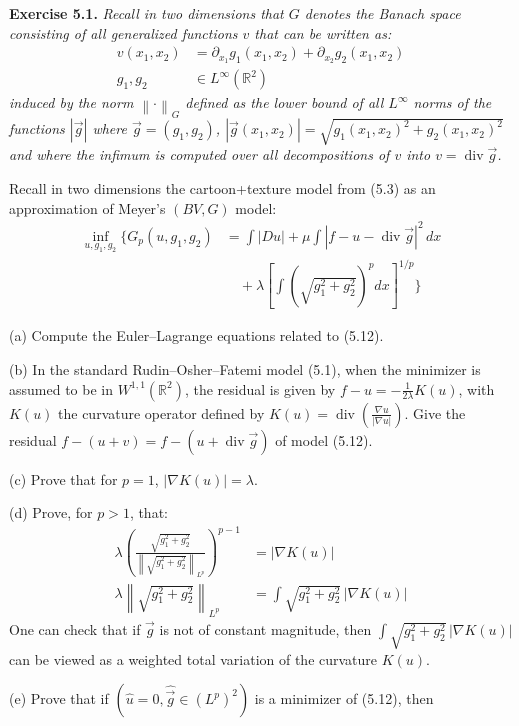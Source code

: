 \documentclass[12pt,letterpaper]{article}
\newcommand{\R}{\mathbb R}
\newcommand{\diver}{\operatorname{div}}
\newcommand{\norm}[1]{\left\lVert #1\right\rVert}
\newcommand{\exercise}[1]{%
  \par\bigskip\noindent\textbf{Exercise #1.}\enspace}
\newenvironment{statement}{\itshape\ignorespaces}{\par}
\begin{document}
\exercise{5.1}
\begin{statement}
Recall in two dimensions that $G$ denotes the Banach space consisting of
all generalized functions $v$ that can be written as:
\begin{align*}
 v(x_1,x_2)&=\partial_{x_1}g_1(x_1,x_2)+\partial_{x_2}g_2(x_1,x_2)\\
 g_1,g_2&\in L^\infty(\R^2)
\end{align*}
induced by the norm $\norm{\cdot}_G$ defined as the lower bound of all
$L^\infty$ norms of the functions $|\vec g|$ where $\vec g=(g_1,g_2)$,
$|\vec g(x_1,x_2)|=\sqrt{g_1(x_1,x_2)^2+g_2(x_1,x_2)^2}$ and where
the infimum is computed over all decompositions of $v$ into
$v=\diver\vec g$.

Recall in two dimensions the cartoon+texture model from (5.3) as an
approximation of Meyer's $(BV,G)$ model:
\begin{align*}
 \inf_{u,g_1,g_2}\biggl\{G_p(u,g_1,g_2)
 &=\int|Du|+\mu\int|f-u-\diver\vec g|^2\,dx\\
 &\quad+\lambda\left[\int\left(\sqrt{g_1^2+g_2^2}\right)^pdx\right]^{1/p}
 \biggr\}
 \tag{5.12}
\end{align*}
\par\smallskip
(a) Compute the Euler--Lagrange equations related to (5.12).
\par\smallskip
(b) In the standard Rudin--Osher--Fatemi model (5.1), when the minimizer
is assumed to be in $W^{1,1}(\R^2)$, the residual is given by
$f-u=-\frac1{2\lambda}K(u)$, with $K(u)$ the curvature operator
defined by $K(u)=\diver\left(\frac{\nabla u}{|\nabla u|}\right)$.
Give the residual $f-(u+v)=f-(u+\diver\vec g)$ of model (5.12).
\par\smallskip
(c) Prove that for $p=1$, $|\nabla K(u)|=\lambda$.
\par\smallskip
(d) Prove, for $p>1$, that:
\begin{align*}
 \lambda\left(
 \frac{\sqrt{g_1^2+g_2^2}}{\norm{\sqrt{g_1^2+g_2^2}}_{L^p}}
 \right)^{p-1}&=|\nabla K(u)|\\
 \lambda\norm{\sqrt{g_1^2+g_2^2}}_{L^p}
 &=\int\sqrt{g_1^2+g_2^2}\,|\nabla K(u)|
\end{align*}
One can check that if $\vec g$ is not of constant magnitude, then
$\int\sqrt{g_1^2+g_2^2}\,|\nabla K(u)|$ can be viewed as a weighted
total variation of the curvature $K(u)$.
\par\smallskip
(e) Prove that if $(\hat u=0,\hat{\vec g}\in(L^p)^2)$ is a minimizer
of (5.12), then
\begin{align*}

\end{align*}
\end{statement}
\end{document}
